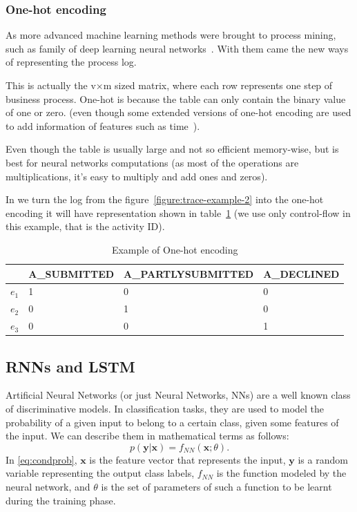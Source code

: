 \subsubsection{One-hot encoding}

As more advanced machine learning methods were brought to process mining, such as family of deep learning neural networks~\cite{evermann,niek96732,quteprints96732,evermann2}. With them came the new ways of representing the process log.

This is actually the v×m sized matrix, where each row represents one step of business process. One-hot is because the table can only contain the binary value of one or zero. (even though some extended versions of one-hot encoding are used to add information of features such as time~\cite{niek96732}). 

Even though the table is usually large and not so efficient memory-wise, but is best for neural networks computations (as most of the operations are multiplications, it's easy to multiply and add ones and zeros). 

In we turn the log from the figure~\ref{figure:trace-example-2} into the one-hot encoding it will have representation shown in table~\ref{tab:one-hot} (we use only control-flow in this example, that is the activity ID).

\begin{table}[h]
	\centering
	\begin{tabular}{| l | l | l | l |}
		\hline
		& A\_SUBMITTED & A\_PARTLYSUBMITTED & A\_DECLINED \\	
		\hline
		$e_{1}$ & 1 & 0 & 0 \\
		$e_{2}$ & 0 & 1 & 0 \\
		$e_{3}$ & 0 & 0 & 1 \\
		\hline
	\end{tabular}
	\caption{Example of One-hot encoding}
	\label{tab:one-hot}
\end{table}



\subsection{RNNs and LSTM}
Artificial Neural Networks (or just Neural Networks, NNs) are a well
known class of discriminative models. In classification tasks, they are
used to model the probability of a given input to belong to a certain
class, given some features of the input. We can describe them in
mathematical terms as follows:
%
\begin{equation}
  \label{eq:condprob}
  p(\mathbf{y}|\mathbf{x}) = f_{\mathit{NN}}(\mathbf{x}; \theta).
\end{equation}
%
In \eqref{eq:condprob}, $\mathbf{x}$ is the feature vector that represents the input,
$\mathbf{y}$ is a random variable representing the output class
labels, $f_{\mathit{NN}}$ is the function modeled by the neural network, and
$\theta$ is the set of parameters of such a function to be learnt during
the training phase.


